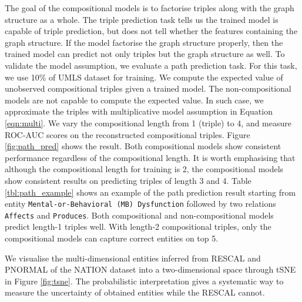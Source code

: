 The goal of the compositional models is to factorise triples along with the graph structure as a whole. 
The triple prediction task tells us the trained model is capable of triple prediction, 
but does not tell whether the features containing the graph structure. 
If the model factorise the graph structure properly, 
then the trained model can predict not only triples but the graph structure as well. 
To validate the model assumption, we evaluate a path prediction task.
For this task, we use 10\% of UMLS dataset for training. 
We compute the expected value of unobserved compositional triples given a trained model. 
The non-compositional models are not capable to compute the expected value. 
In such case, we approximate the triples with multiplicative model assumption in Equation \ref{eqn:multi}. 
We vary the compositional length from 1 (triple) to 4, and measure ROC-AUC scores on the reconstructed compositional triples. 
Figure \ref{fig:path_pred} shows the result. 
Both compositional models show consistent performance regardless of the compositional length. 
It is worth emphasising that although the compositional length for training is 2, 
the compositional models show consistent results on predicting triples of length 3 and 4. 
Table \ref{tbl:path_example} shows an example of the path prediction result 
starting from entity \texttt{Mental-or-Behavioral (MB) Dysfunction} followed by two relations \texttt{Affects} and \texttt{Produces}. 
Both compositional and non-compositional models predict length-1 triples well. 
With length-2 compositional triples, only the compositional models can capture correct entities on top 5.

We visualise the multi-dimensional entities inferred from RESCAL and PNORMAL of the NATION dataset into a two-dimensional space through tSNE \cite{VanDerMaaten2008} in Figure \ref{fig:tsne}. The probabilistic interpretation gives a systematic way to measure the uncertainty of obtained entities while the RESCAL cannot.
